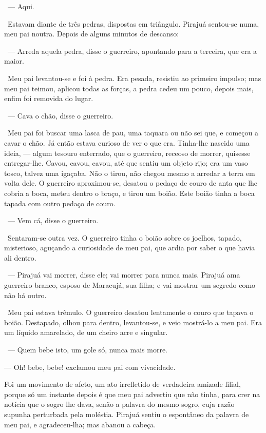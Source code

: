 ~--- Aqui.

~Estavam diante de três pedras, dispostas em triângulo. Pirajuá
sentou-se numa, meu pai noutra. Depois de alguns minutos de descanso:

~--- Arreda aquela pedra, disse o guerreiro, apontando para a terceira,
que era a maior.

~Meu pai levantou-se e foi à pedra. Era pesada, resistiu ao primeiro
impulso; mas meu pai teimou, aplicou todas as forças, a pedra cedeu um
pouco, depois mais, enfim foi removida do lugar.

~--- Cava o chão, disse o guerreiro.

~Meu pai foi buscar uma lasca de pau, uma taquara ou não sei que, e
começou a cavar o chão. Já então estava curioso de ver o que era.
Tinha-lhe nascido uma ideia, --- algum tesouro enterrado, que o
guerreiro, receoso de morrer, quisesse entregar-lhe. Cavou, cavou,
cavou, até que sentiu um objeto rijo; era um vaso tosco, talvez uma
igaçaba. Não o tirou, não chegou mesmo a arredar a terra em volta dele.
O guerreiro aproximou-se, desatou o pedaço de couro de anta que lhe
cobria a boca, meteu dentro o braço, e tirou um boião. Este boião tinha
a boca tapada com outro pedaço de couro.

~--- Vem cá, disse o guerreiro.

~Sentaram-se outra vez. O guerreiro tinha o boião sobre os joelhos,
tapado, misterioso, aguçando a curiosidade de meu pai, que ardia por
saber o que havia ali dentro.

~--- Pirajuá vai morrer, disse ele; vai morrer para nunca mais. Pirajuá
ama guerreiro branco, esposo de Maracujá, sua filha; e vai mostrar um
segredo como não há outro.

~Meu pai estava trêmulo. O guerreiro desatou lentamente o couro que
tapava o boião. Destapado, olhou para dentro, levantou-se, e veio
mostrá-lo a meu pai. Era um líquido amarelado, de um cheiro acre e
singular.

~--- Quem bebe isto, um gole só, nunca mais morre.

--- Oh! bebe, bebe! exclamou meu pai com vivacidade.

Foi um movimento de afeto, um ato irrefletido de verdadeira amizade
filial, porque só um instante depois é que meu pai advertiu que não
tinha, para crer na notícia que o sogro lhe dava, senão a palavra do
mesmo sogro, cuja razão supunha perturbada pela moléstia. Pirajuá sentiu
o espontâneo da palavra de meu pai, e agradeceu-lha; mas abanou a
cabeça.

